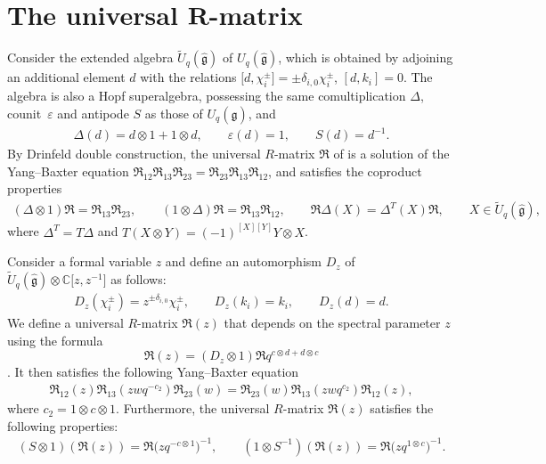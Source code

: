 \documentclass[10pt,a4paper]{amsart}
\numberwithin{equation}{section}
\begin{document}
\section[The universal R-matrix]{The universal $\boldsymbol{R}$-matrix}\label{sec3}

Consider the extended algebra $\widetilde{U}_q(\mathfrak{\hat{g}})$ of $U_q(\mathfrak{\hat{g}})$, which is obtained by adjoining an additional element $d$ with the relations
$ \bigl[d, \chi_i^{\pm}\bigr]=\pm \delta_{i,0}\chi_i^{\pm}$, $ [d, k_i]=0$.
The algebra  is also a Hopf superalgebra, possessing the same comultiplication
$\Delta$, counit~$\varepsilon$ and antipode $S$ as those of $U_q(\mathfrak{\hat{g}})$, and
\begin{gather*}
 \Delta(d)=d\otimes1+1\otimes d,\qquad \varepsilon(d)=1,\qquad S(d)=d^{-1}.
\end{gather*}
By Drinfeld double construction, the universal $R$-matrix $\mathfrak{R}$ of  is a solution of the Yang--Baxter equation
$\mathfrak{R}_{12}\mathfrak{R}_{13}\mathfrak{R}_{23}=\mathfrak{R}_{23}\mathfrak{R}_{13}\mathfrak{R}_{12}$,
and satisfies the coproduct properties
\begin{gather*}
 (\Delta\otimes 1)\mathfrak{R}=\mathfrak{R}_{13}\mathfrak{R}_{23},\qquad (1\otimes \Delta)\mathfrak{R}=\mathfrak{R}_{13}\mathfrak{R}_{12}, \qquad
 \mathfrak{R}\Delta(X)=\Delta^T(X)\mathfrak{R}, \qquad X\in\widetilde{U}_q(\mathfrak{\hat{g}}),
\end{gather*}
where $\Delta^T=T\Delta$ and $T(X\otimes Y)=(-1)^{[X][Y]}Y\otimes X$.


Consider a formal variable $z$ and define an automorphism $D_z$ of $\widetilde{U}_q(\mathfrak{\hat{g}})\otimes\mathbb{C}\bigl[z, z^{-1}\bigr]$ as follows:
\begin{gather}\label{Dz}
 D_z(\chi_i^{\pm})=z^{\pm\delta_{i,0}}\chi_i^{\pm}, \qquad D_z(k_i)=k_i, \qquad D_z(d)=d.
\end{gather}
We define a universal $R$-matrix $\mathfrak{R}(z)$ that depends on the spectral parameter $z$ using the formula~\[
\mathfrak{R}(z)=(D_z\otimes1)\mathfrak{R}q^{c\otimes d+d\otimes c}\].
It then satisfies the following Yang--Baxter equation
\begin{gather}\label{oper0}
 \mathfrak{R}_{12}(z)\mathfrak{R}_{13}(zwq^{-c_2})\mathfrak{R}_{23}(w)=\mathfrak{R}_{23}(w)\mathfrak{R}_{13}(zwq^{c_2})\mathfrak{R}_{12}(z),
\end{gather}where $c_2=1\otimes c\otimes1$.
Furthermore, the universal $R$-matrix $\mathfrak{R}(z)$ satisfies the following properties:
\begin{gather*}%
 (S\otimes1)(\mathfrak{R}(z))=\mathfrak{R}\bigl(zq^{-c\otimes1}\bigr)^{-1},\qquad (1\otimes S^{-1})(\mathfrak{R}(z))=\mathfrak{R}\bigl(zq^{1\otimes c}\bigr)^{-1}.
\end{gather*}
\end{document}
